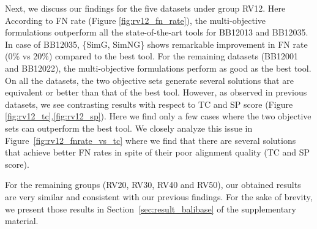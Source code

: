 Next, we discuss our findings for the five datasets under group RV12. Here According to FN rate (Figure \ref{fig:rv12_fn_rate}), the multi-objective formulations outperform all the state-of-the-art tools for BB12013 and BB12035. In case of BB12035, \{SimG, SimNG\} shows remarkable improvement in FN rate (0\% vs 20\%) compared to the best tool. For the remaining datasets (BB12001 and BB12022), the multi-objective formulations perform as good as the best tool. On all the datasets, the two objective sets generate several solutions that are equivalent or better than that of the best tool.
However, as observed in previous datasets, we see contrasting results with respect to TC and SP score (Figure \ref{fig:rv12_tc},\ref{fig:rv12_sp}). Here we find only a few cases where the two objective sets can outperform the best tool. We closely analyze this issue in Figure~\ref{fig:rv12_fnrate_vs_tc} where we find that there are several solutions that achieve better FN rates in spite of their poor alignment quality (TC and SP score).


For the remaining groups (RV20, RV30, RV40 and RV50), our obtained results are very similar and consistent with our previous findings. For the sake of brevity, we present those results in Section~\ref{sec:result_balibase} of the supplementary material.



